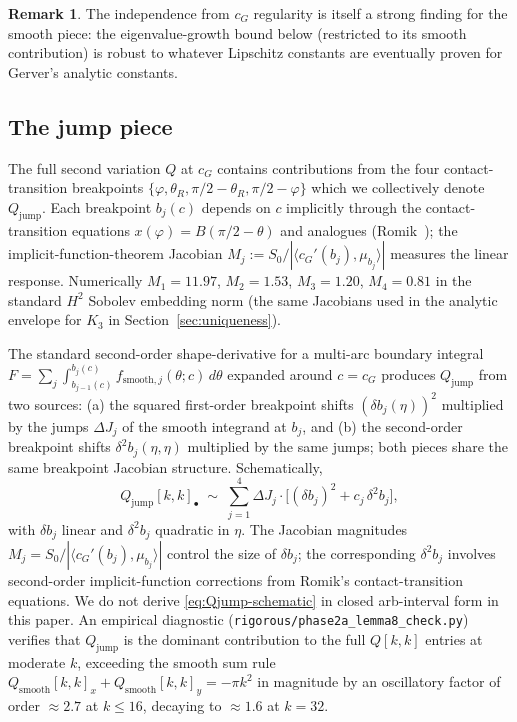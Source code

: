 \documentclass[11pt]{amsart}
\theoremstyle{plain}
\theoremstyle{definition}
\newtheorem{remark}[theorem]{Remark}
\newcommand{\cG}{c_{G}}
\begin{document}
\begin{remark}
The independence from $\cG$ regularity is itself a strong
finding for the smooth piece: the eigenvalue-growth bound below
(restricted to its smooth contribution) is robust to whatever
Lipschitz constants are eventually proven for Gerver's analytic
constants.
\end{remark}

\subsection{The jump piece}\label{sec:jump-piece}

The full second variation $Q$ at $\cG$ contains contributions
from the four contact-transition breakpoints
$\{\varphi, \theta_{R}, \pi/2 - \theta_{R}, \pi/2 - \varphi\}$
which we collectively denote $Q_{\mathrm{jump}}$.  Each breakpoint
$b_{j}(c)$ depends on $c$ implicitly through the contact-transition
equations
$x(\varphi) = B(\pi/2 - \theta)$ and analogues
(Romik~\cite[\S4]{Romik2018}); the implicit-function-theorem
Jacobian $M_{j} := S_{0} / |\langle c_{G}'(b_{j}),
\mu_{b_{j}}\rangle|$ measures the linear response.  Numerically
$M_{1} = 11.97$, $M_{2} = 1.53$, $M_{3} = 1.20$, $M_{4} = 0.81$
in the standard $H^{2}$ Sobolev embedding norm (the same Jacobians
used in the analytic envelope for $K_{3}$ in
Section~\ref{sec:uniqueness}).

The standard second-order shape-derivative for a multi-arc
boundary integral
$F = \sum_{j}\int_{b_{j-1}(c)}^{b_{j}(c)} f_{\mathrm{smooth},j}(\theta;c)\,d\theta$
expanded around $c = c_{G}$ produces $Q_{\mathrm{jump}}$ from two
sources: (a) the squared first-order breakpoint shifts
$(\delta b_{j}(\eta))^{2}$ multiplied by the jumps $\Delta J_{j}$
of the smooth integrand at $b_{j}$, and (b) the second-order
breakpoint shifts $\delta^{2} b_{j}(\eta, \eta)$ multiplied by
the same jumps; both pieces share the same breakpoint Jacobian
structure.  Schematically,
\begin{equation}\label{eq:Qjump-schematic}
   Q_{\mathrm{jump}}[k,k]_{\bullet}
   \;\sim\; \sum_{j=1}^{4} \Delta J_{j}\cdot
            \bigl[(\delta b_{j})^{2}
                 + c_{j}\, \delta^{2} b_{j}\bigr],
\end{equation}
with $\delta b_{j}$ linear and $\delta^{2} b_{j}$ quadratic in
$\eta$.  The Jacobian magnitudes
$M_{j} = S_{0}/|\langle c_{G}'(b_{j}), \mu_{b_{j}}\rangle|$ control
the size of $\delta b_{j}$; the corresponding $\delta^{2} b_{j}$
involves second-order implicit-function corrections from Romik's
contact-transition equations.  We do not derive
\eqref{eq:Qjump-schematic} in closed arb-interval form in this
paper.  An empirical diagnostic
(\texttt{rigorous/phase2a\_lemma8\_check.py}) verifies that
$Q_{\mathrm{jump}}$ is the dominant contribution to the full
$Q[k,k]$ entries at moderate $k$, exceeding the smooth
sum rule $Q_{\mathrm{smooth}}[k,k]_{x} + Q_{\mathrm{smooth}}[k,k]_{y}
= -\pi k^{2}$ in magnitude by an oscillatory factor of order
$\approx 2.7$ at $k \leq 16$, decaying to $\approx 1.6$ at $k = 32$.
\end{document}
